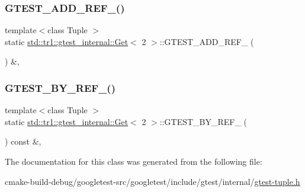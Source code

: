 \subsubsection{\texorpdfstring{GTEST\_ADD\_REF\_()}{GTEST\_ADD\_REF\_()}}
{\footnotesize\ttfamily template$<$class Tuple $>$ \\
static \mbox{\hyperlink{classstd_1_1tr1_1_1gtest__internal_1_1Get}{std\+::tr1\+::gtest\+\_\+internal\+::\+Get}}$<$ 2 $>$\+::G\+T\+E\+S\+T\+\_\+\+A\+D\+D\+\_\+\+R\+E\+F\+\_\+ (\begin{DoxyParamCaption}\item[{\mbox{\hyperlink{gtest-tuple_8h_a1b7f133d8aa02e0b7afed7b66781eeb7}{G\+T\+E\+S\+T\+\_\+\+T\+U\+P\+L\+E\+\_\+\+E\+L\+E\+M\+E\+N\+T\+\_\+}}(2, Tuple)}]{ }\end{DoxyParamCaption}) \&\hspace{0.3cm}{\ttfamily [inline]}, {\ttfamily [static]}}

\mbox{\label{classstd_1_1tr1_1_1gtest__internal_1_1Get_3_012_01_4_a76127c9c03c1f0caa61fb87d4d756b5b}} 
\subsubsection{\texorpdfstring{GTEST\_BY\_REF\_()}{GTEST\_BY\_REF\_()}}
{\footnotesize\ttfamily template$<$class Tuple $>$ \\
static \mbox{\hyperlink{classstd_1_1tr1_1_1gtest__internal_1_1Get}{std\+::tr1\+::gtest\+\_\+internal\+::\+Get}}$<$ 2 $>$\+::G\+T\+E\+S\+T\+\_\+\+B\+Y\+\_\+\+R\+E\+F\+\_\+ (\begin{DoxyParamCaption}\item[{\mbox{\hyperlink{gtest-tuple_8h_a1b7f133d8aa02e0b7afed7b66781eeb7}{G\+T\+E\+S\+T\+\_\+\+T\+U\+P\+L\+E\+\_\+\+E\+L\+E\+M\+E\+N\+T\+\_\+}}(2, Tuple)}]{ }\end{DoxyParamCaption}) const \&\hspace{0.3cm}{\ttfamily [inline]}, {\ttfamily [static]}}



The documentation for this class was generated from the following file\+:\begin{DoxyCompactItemize}
\item 
cmake-\/build-\/debug/googletest-\/src/googletest/include/gtest/internal/\mbox{\hyperlink{gtest-tuple_8h}{gtest-\/tuple.\+h}}\end{DoxyCompactItemize}
